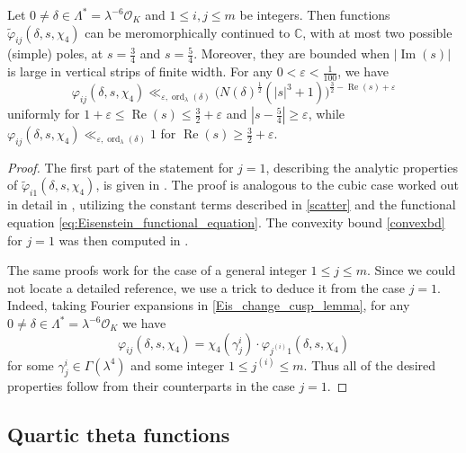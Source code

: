 \documentclass[12pt,reqno]{amsart}
\numberwithin{equation}{section}
\renewcommand{\Im}{\operatorname{Im}}
\renewcommand{\Re}{\operatorname{Re}}
\newcommand{\ord}{\operatorname{ord}}
\begin{document}
\begin{prop} \label{merovarphi}  
    Let $0 \neq \delta \in \Lambda^* = \lambda^{-6}\mathcal{O}_K$ and $1\leq i, j\leq m$ be integers. Then functions $\widetilde{\varphi}_{i j}(\delta,s,\chi_4)$ can be meromorphically continued to $\mathbb{C}$, with at most two possible (simple) poles, at $s=\frac{3}{4}$ and $s=\frac{5}{4}$. Moreover, they are bounded when $|{\Im(s)}|$ is large in vertical strips of finite width. For any $0<\varepsilon<\frac{1}{100}$, we have
    \begin{equation} \label{convexbd}
        \varphi_{i j}(\delta,s,\chi_4)  \ll_{\varepsilon, \ord_{\lambda}(\delta)} \big(N(\delta)^{\frac{1}{2}} (|s|^3+1)\big)^{\frac{3}{2}-\Re(s)+\varepsilon}
    \end{equation}
    uniformly for $1+\varepsilon \leq \Re(s) \leq \frac{3}{2}+\varepsilon$ and $|s- \frac{5}{4} | \geq \varepsilon$, while $\varphi_{i j}(\delta,s,\chi_4) \ll_{\varepsilon, \ord_{\lambda}(\delta)} 1$ for $\Re(s) \geq \frac{3}{2}+\varepsilon$. 
\end{prop}

\begin{proof}
    The first part of the statement for $j=1$, describing the analytic properties of $\widetilde{\varphi}_{i 1}(\delta,s,\chi_4)$, is given in \cite[Theorem 2.1]{Dia}. The proof is analogous to the cubic case worked out in detail in \cite[Theorem~6.1]{Pat1}, utilizing the constant terms described in \cref{scatter} and the functional equation \eqref{eq:Eisenstein_functional_equation}. The convexity bound \eqref{convexbd} for $j=1$ was then computed in \cite[Proposition 4.3]{DDHL}. 
    
    The same proofs work for the case of a general integer $1\leq j\leq m$. Since we could not locate a detailed reference, we use a trick to deduce it from the case $j=1$. Indeed, taking Fourier expansions in \cref{Eis_change_cusp_lemma}, for any $0 \neq \delta \in \Lambda^* = \lambda^{-6}\mathcal{O}_K$ we have
    \begin{equation*}
        \varphi_{ij}(\delta, s, \chi_4) = \chi_4(\gamma_j^i)\cdot \varphi_{j^{(i)} 1}(\delta, s, \chi_4)
    \end{equation*}
    for some $\gamma_j^i \in \Gamma(\lambda^4)$ and some integer $1\leq j^{(i)}\leq m$. Thus all of the desired properties follow from their counterparts in the case $j=1$.
\end{proof}

\subsection{Quartic theta functions}
\end{document}
